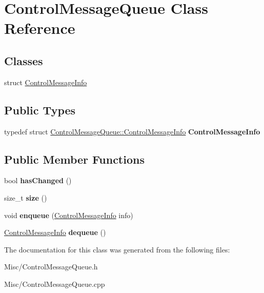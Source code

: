\hypertarget{classControlMessageQueue}{}\section{Control\+Message\+Queue Class Reference}
\label{classControlMessageQueue}
\subsection*{Classes}
\begin{DoxyCompactItemize}
\item 
struct \hyperlink{structControlMessageQueue_1_1ControlMessageInfo}{Control\+Message\+Info}
\end{DoxyCompactItemize}
\subsection*{Public Types}
\begin{DoxyCompactItemize}
\item 
typedef struct \hyperlink{structControlMessageQueue_1_1ControlMessageInfo}{Control\+Message\+Queue\+::\+Control\+Message\+Info} {\bfseries Control\+Message\+Info}\hypertarget{classControlMessageQueue_a50df92d449dae01e49fd0e836c7d1f2e}{}\label{classControlMessageQueue_a50df92d449dae01e49fd0e836c7d1f2e}

\end{DoxyCompactItemize}
\subsection*{Public Member Functions}
\begin{DoxyCompactItemize}
\item 
bool {\bfseries has\+Changed} ()\hypertarget{classControlMessageQueue_ad0d97de85cb34b781fde757b665fb22e}{}\label{classControlMessageQueue_ad0d97de85cb34b781fde757b665fb22e}

\item 
size\+\_\+t {\bfseries size} ()\hypertarget{classControlMessageQueue_a3b2d120facfc58fcdc315a806d76851a}{}\label{classControlMessageQueue_a3b2d120facfc58fcdc315a806d76851a}

\item 
void {\bfseries enqueue} (\hyperlink{structControlMessageQueue_1_1ControlMessageInfo}{Control\+Message\+Info} info)\hypertarget{classControlMessageQueue_a766bed9ca18a663bba82cc32c253049a}{}\label{classControlMessageQueue_a766bed9ca18a663bba82cc32c253049a}

\item 
\hyperlink{structControlMessageQueue_1_1ControlMessageInfo}{Control\+Message\+Info} {\bfseries dequeue} ()\hypertarget{classControlMessageQueue_a95142f7602e0a64b38a8f1cb02ef9497}{}\label{classControlMessageQueue_a95142f7602e0a64b38a8f1cb02ef9497}

\end{DoxyCompactItemize}


The documentation for this class was generated from the following files\+:\begin{DoxyCompactItemize}
\item 
Misc/Control\+Message\+Queue.\+h\item 
Misc/Control\+Message\+Queue.\+cpp\end{DoxyCompactItemize}
